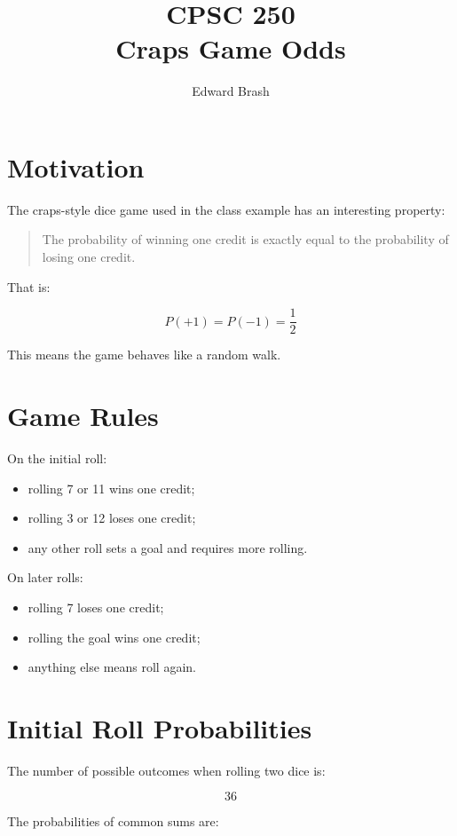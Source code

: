 \documentclass[11pt]{article}
\title{CPSC 250 \\ Craps Game Odds}
\author{Edward Brash}
\date{}
\begin{document}
\maketitle

\section{Motivation}

The craps-style dice game used in the class example has an interesting property:

\begin{quote}
The probability of winning one credit is exactly equal to the probability of losing one credit.
\end{quote}

That is:

\[
P(+1) = P(-1) = \frac{1}{2}
\]

This means the game behaves like a random walk.

\section{Game Rules}

On the initial roll:

\begin{itemize}
    \item rolling 7 or 11 wins one credit;
    \item rolling 3 or 12 loses one credit;
    \item any other roll sets a goal and requires more rolling.
\end{itemize}

On later rolls:

\begin{itemize}
    \item rolling 7 loses one credit;
    \item rolling the goal wins one credit;
    \item anything else means roll again.
\end{itemize}

\section{Initial Roll Probabilities}

The number of possible outcomes when rolling two dice is:

\[
36
\]

The probabilities of common sums are:
\end{document}
